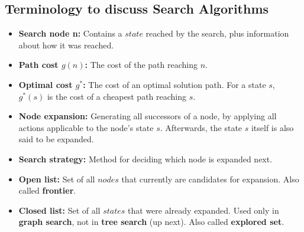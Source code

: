\documentclass[conference, a4paper]{styles/acmsiggraph}
\begin{document}
        
        
        
        
        

    \subsection{Terminology to discuss Search Algorithms}
        \begin{itemize}
            \item \textbf{Search node n:}\newline
                Contains a $state$ reached by the search, plus information about how it was reached.
            \item \textbf{Path cost $g(n)$:}\newline
                The cost of the path reaching $n$.
            \item \textbf{Optimal cost $g^*$:}\newline
                The cost of an optimal solution path.
                For a state $s$, $g^*(s)$ is the cost of a cheapest path reaching $s$.
            \item \textbf{Node expansion:}\newline
                Generating all successors of a node, by applying all actions applicable to the node's state $s$.
                Afterwards, the state $s$ itself is also said to be expanded.
            \item \textbf{Search strategy:}\newline
                Method for deciding which node is expanded next.
            \item \textbf{Open list:}\newline
                Set of all $nodes$ that currently are candidates for expansion.
                Also called \textbf{frontier}.
            \item \textbf{Closed list:}\newline
                Set of all $states$ that were already expanded.
                Used only in \textbf{graph search}, not in \textbf{tree search} (up next).
                Also called \textbf{explored set}.
        \end{itemize}
    
\end{document}
